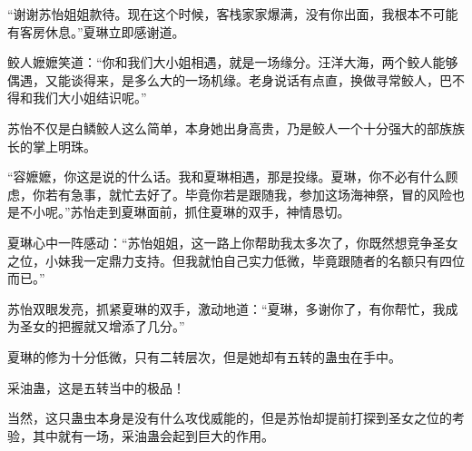 \begin{this_body}
“谢谢苏怡姐姐款待。现在这个时候，客栈家家爆满，没有你出面，我根本不可能有客房休息。”夏琳立即感谢道。

鲛人嬷嬷笑道：“你和我们大小姐相遇，就是一场缘分。汪洋大海，两个鲛人能够偶遇，又能谈得来，是多么大的一场机缘。老身说话有点直，换做寻常鲛人，巴不得和我们大小姐结识呢。”

苏怡不仅是白鳞鲛人这么简单，本身她出身高贵，乃是鲛人一个十分强大的部族族长的掌上明珠。

“容嬷嬷，你这是说的什么话。我和夏琳相遇，那是投缘。夏琳，你不必有什么顾虑，你若有急事，就忙去好了。毕竟你若是跟随我，参加这场海神祭，冒的风险也是不小呢。”苏怡走到夏琳面前，抓住夏琳的双手，神情恳切。

夏琳心中一阵感动：“苏怡姐姐，这一路上你帮助我太多次了，你既然想竞争圣女之位，小妹我一定鼎力支持。但我就怕自己实力低微，毕竟跟随者的名额只有四位而已。”

苏怡双眼发亮，抓紧夏琳的双手，激动地道：“夏琳，多谢你了，有你帮忙，我成为圣女的把握就又增添了几分。”

夏琳的修为十分低微，只有二转层次，但是她却有五转的蛊虫在手中。

采油蛊，这是五转当中的极品！

当然，这只蛊虫本身是没有什么攻伐威能的，但是苏怡却提前打探到圣女之位的考验，其中就有一场，采油蛊会起到巨大的作用。

\end{this_body}

